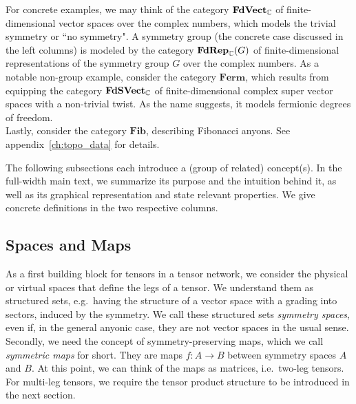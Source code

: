 \begin{doublecol}
    For concrete examples, we may think of the category $\mathbf{FdVect}_{\mathbb{C}}$ of finite-dimensional vector spaces over the complex numbers, which models the trivial symmetry or ``no symmetry".
    A symmetry group (the concrete case discussed in the left columns) is modeled by the category $\mathbf{FdRep}_{\mathbb{C}}(G)$ of finite-dimensional representations of the symmetry group $G$ over the complex numbers.
    As a notable non-group example, consider the category $\mathbf{Ferm}$, which results from equipping the category $\mathbf{FdSVect}_{\mathbb{C}}$ of finite-di\-men\-sion\-al complex super vector spaces with a non-trivial twist.
    As the name suggests, it models fermionic degrees of freedom.
    \\
    Lastly, consider the category $\mathbf{Fib}$, describing Fibonacci anyons.
    See appendix~\ref{ch:topo_data} for details.
\end{doublecol}

The following subsections each introduce a (group of related) concept(s).
%
In the full-width main text, we summarize its purpose and the intuition behind it, as well as its graphical representation and state relevant properties.
%
We give concrete definitions in the two respective columns.

\subsection{Spaces and Maps}
\label{subsec:nonablian:basics:spaces_maps}


As a first building block for tensors in a tensor network, we consider the physical or virtual spaces that define the legs of a tensor.
%
We understand them as structured sets, e.g.~having the structure of a vector space with a grading into sectors, induced by the symmetry.
%
We call these structured sets \emph{symmetry spaces}, even if, in the general anyonic case, they are not vector spaces in the usual sense.
%
Secondly, we need the concept of symmetry-preserving maps, which we call \emph{symmetric maps} for short.
%
They are maps $f: A \to B$ between symmetry spaces $A$ and $B$.
%
At this point, we can think of the maps as matrices, i.e.~two-leg tensors.
%
For multi-leg tensors, we require the tensor product structure to be introduced in the next section.


